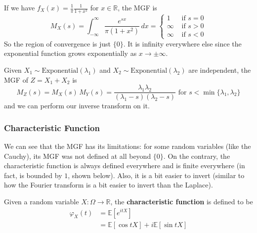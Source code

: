 \documentclass{article}
\begin{document}
      \begin{example}[Cauchy RV]
        If we have $f_X (x) = \frac{1}{\pi} \frac{1}{1 + x^2}$ for $x \in \mathbb{R}$, the MGF is 
        \begin{equation}
          M_X (s) = \int_{-\infty}^\infty \frac{e^{s x}}{\pi (1 + x^2)} \,dx = \begin{cases} 1 & \text{ if } s = 0 \\
          \infty & \text{ if } s > 0 \\ 
          \infty & \text{ if } s < 0 \end{cases}
        \end{equation}
        So the region of convergence is just $\{0\}$. It is infinity everywhere else since the exponential function grows exponentially as $x \rightarrow \pm \infty$. 
      \end{example}

      \begin{example}
        Given $X_1 \sim \mathrm{Exponential}(\lambda_1)$ and $X_2 \sim \mathrm{Exponential}(\lambda_2)$ are independent, the MGF of $Z = X_1 + X_2$ is 
        \begin{equation}
          M_Z (s) = M_X (s) \, M_Y (s) = \frac{\lambda_1 \lambda_2}{(\lambda_1 - s)(\lambda_2 - s)} \text{ for } s < \min\{\lambda_1, \lambda_2\}
        \end{equation}
        and we can perform our inverse transform on it. 
      \end{example}

    \subsubsection{Characteristic Function}

      We can see that the MGF has its limitations: for some random variables (like the Cauchy), its MGF was not defined at all beyond $\{0\}$. On the contrary, the characteristic function is always defined everywhere and is finite everywhere (in fact, is bounded by $1$, shown below). Also, it is a bit easier to invert (similar to how the Fourier transform is a bit easier to invert than the Laplace). 

      \begin{definition}
        Given a random variable $X: \Omega \longrightarrow \mathbb{R}$, the \textbf{characteristic function} is defined to be 
        \begin{align*}
          \varphi_X (t) & = \mathbb{E}[ e^{i t X} ] \\
          & = \mathbb{E}[\cos{t X}] + i \mathbb{E}[ \sin{t X}]
        \end{align*}
      \end{definition}
\end{document}
